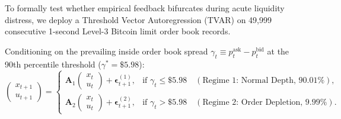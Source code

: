 \documentclass[12pt]{article}
\theoremstyle{definition}
\theoremstyle{remark}
\begin{document}
To formally test whether empirical feedback bifurcates during acute liquidity distress, we deploy a Threshold Vector Autoregression (TVAR) on 49,999 consecutive 1-second Level-3 Bitcoin limit order book records.

Conditioning on the prevailing inside order book spread $\gamma_t \equiv p_t^{\text{ask}} - p_t^{\text{bid}}$ at the 90th percentile threshold ($\gamma^* = \$5.98$):
\begin{equation}
\begin{pmatrix} x_{t+1} \\ u_{t+1} \end{pmatrix} = \begin{cases} 
\mathbf{A}_1 \begin{pmatrix} x_t \\ u_t \end{pmatrix} + \boldsymbol{\epsilon}_{t+1}^{(1)}, & \text{if } \gamma_t \le \$5.98 \quad (\text{Regime 1: Normal Depth, 90.01\%}), \\[8pt]
\mathbf{A}_2 \begin{pmatrix} x_t \\ u_t \end{pmatrix} + \boldsymbol{\epsilon}_{t+1}^{(2)}, & \text{if } \gamma_t > \$5.98 \quad (\text{Regime 2: Order Depletion, 9.99\%}).
\end{cases}
\end{equation}

\begin{table}[htbp]
\centering\footnotesize
\setlength{\tabcolsep}{3pt}
\caption{Threshold Vector Autoregression (TVAR) estimates across order book depth states on $49{,}999$ Level-3 BTC limit order book records. Differenced returns follow $\Delta x_{t+1} = c + a_\Delta x_t + \hat{q} u_t$, corresponding to price level persistence $a_{\text{level}} = 1 + a_\Delta$ and Depth-Scaled Price Sensitivity $I_{\text{depth}} \equiv \kappa \hat{q}$ (depth scaling $\kappa = 10.0~\text{bps}/\text{unit}$). The total closed-loop sensitivity diagnostic is $\hat{\Xi}_{\text{depth}} \equiv a_{\text{level}} + I_{\text{depth}}$.}
\label{tab:threshold_var}
\end{table}
\end{document}
